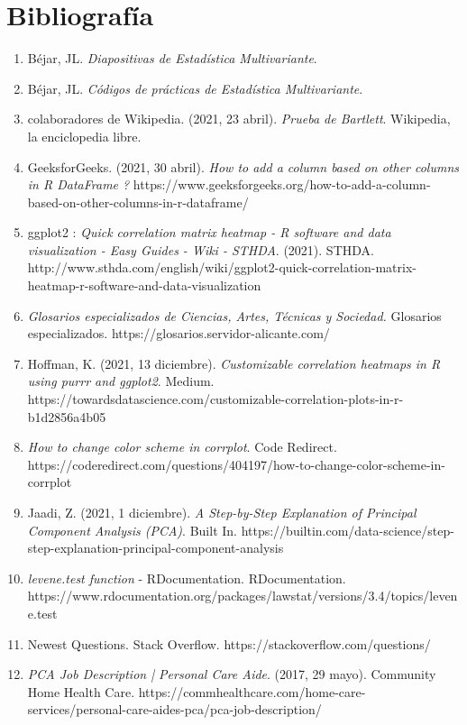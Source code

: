 \documentclass[letterpaper,11pt]{article}
\begin{document}
\section{Bibliografía}
\begin{enumerate}

\item Béjar, JL. \textit{Diapositivas de Estadística Multivariante}.

\item Béjar, JL. \textit{Códigos de prácticas de Estadística Multivariante}.

\item colaboradores de Wikipedia. (2021, 23 abril). \textit{Prueba de Bartlett}. Wikipedia, la enciclopedia libre.

\item GeeksforGeeks. (2021, 30 abril). \textit{How to add a column based on other columns in R DataFrame ?} https://www.geeksforgeeks.org/how-to-add-a-column-based-on-other-columns-in-r-dataframe/

\item ggplot2 : \textit{Quick correlation matrix heatmap - R software and data visualization - Easy Guides - Wiki - STHDA}. (2021). STHDA. http://www.sthda.com/english/wiki/ggplot2-quick-correlation-matrix-heatmap-r-software-and-data-visualization

\item \textit{Glosarios especializados de Ciencias, Artes, Técnicas y Sociedad.} Glosarios especializados. https://glosarios.servidor-alicante.com/

\item Hoffman, K. (2021, 13 diciembre).\textit{ Customizable correlation heatmaps in R using purrr and ggplot2}. Medium. https://towardsdatascience.com/customizable-correlation-plots-in-r-b1d2856a4b05

\item \textit{How to change color scheme in corrplot}. Code Redirect. https://coderedirect.com/questions/404197/how-to-change-color-scheme-in-corrplot

\item Jaadi, Z. (2021, 1 diciembre). \textit{A Step-by-Step Explanation of Principal Component Analysis (PCA)}. Built In. https://builtin.com/data-science/step-step-explanation-principal-component-analysis

\item \textit{levene.test function} - RDocumentation. RDocumentation. https://www.rdocumentation.org/packages/lawstat/versions/3.4/topics/levene.test

\item Newest Questions. Stack Overflow. https://stackoverflow.com/questions/

\item \textit{PCA Job Description | Personal Care Aide}. (2017, 29 mayo). Community Home Health Care. https://commhealthcare.com/home-care-services/personal-care-aides-pca/pca-job-description/

\end{enumerate}
\end{document}
